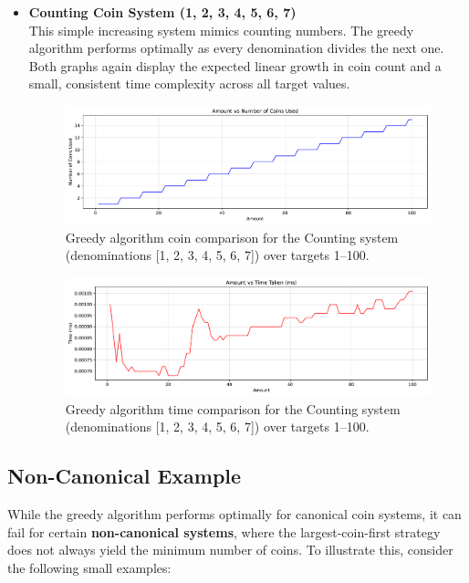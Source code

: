 \documentclass[12pt,a4paper]{report}
\begin{document}
\begin{itemize}
  \item \textbf{Counting Coin System (1, 2, 3, 4, 5, 6, 7)}\\
  This simple increasing system mimics counting numbers. The greedy algorithm performs optimally as every denomination divides the next one. Both graphs again display the expected linear growth in coin count and a small, consistent time complexity across all target values.  
  \begin{figure}[H]
    \centering
    \includegraphics[width=\textwidth]{graphs/greedy_coins_counting_plot.pdf}
    \caption{Greedy algorithm coin comparison for the Counting system (denominations [1, 2, 3, 4, 5, 6, 7]) over targets 1--100.}
    \label{fig:greedy_coins_counting_plot}
  \end{figure}
  \begin{figure}[H]
    \centering
    \includegraphics[width=\textwidth]{graphs/greedy_time_counting_plot.pdf}
    \caption{Greedy algorithm time comparison for the Counting system (denominations [1, 2, 3, 4, 5, 6, 7]) over targets 1--100.}
    \label{fig:greedy_time_counting_plot}
  \end{figure}
\end{itemize}

\subsection{Non-Canonical Example}
\noindent
While the greedy algorithm performs optimally for canonical coin systems, it can fail for certain \textbf{non-canonical systems}, where the largest-coin-first strategy does not always yield the minimum number of coins. To illustrate this, consider the following small examples:
\end{document}
